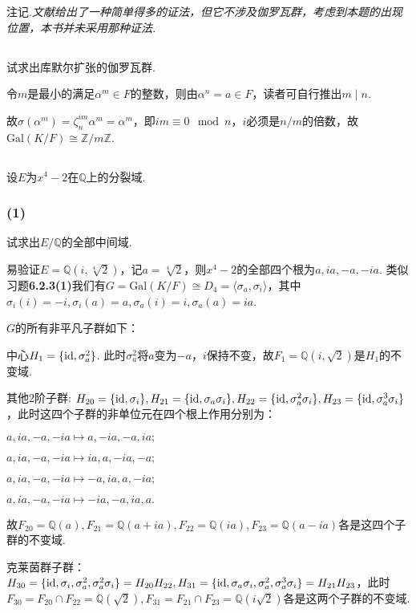{\heiti 注记.}\emph{文献}\cite{403963}\emph{给出了一种简单得多的证法，但它不涉及伽罗瓦群，考虑到本题的出现位置，本书并未采用那种证法.}

\subsection{}
试求出库默尔扩张的伽罗瓦群.

\jie 令$m$是最小的满足$\alpha^m\in F$的整数，则由$\alpha^n=a\in F$，读者可自行推出$m\mid n$.

故$\sigma(\alpha^m)=\zeta_n^{im}\alpha^m=\alpha^m$，即$im\equiv 0\mod n$，$i$必须是$n/m$的倍数，故$\mathrm{Gal}(K/F)\cong \mathbb{Z}/m\mathbb{Z}$.

\subsection{}
设$E$为$x^4-2$在$\mathbb{Q}$上的分裂域.
\subsubsection{(1)}
试求出$E/\mathbb{Q}$的全部中间域.

\jie 易验证$E=\mathbb{Q}(i,\sqrt[4]{2})$，记$a=\sqrt[4]{2}$，则$x^4-2$的全部四个根为$a,ia,-a,-ia$. 类似{\heiti 习题}\textbf{6.2.3(1)}我们有$G=\mathrm{Gal}(K/F)\cong D_4=\langle \sigma_a, \sigma_i\rangle$，其中$\sigma_i(i)=-i,\sigma_i(a)=a, \sigma_a(i)=i, \sigma_a(a)=ia$.

$G$的所有非平凡子群如下：

中心$H_1=\{\operatorname{id}, \sigma_a^2\}$. 此时$\sigma_a^2$将$a$变为$-a$，$i$保持不变，故$F_1=\mathbb{Q}(i,\sqrt{2})$是$H_1$的不变域.

其他$2$阶子群: $H_{20}=\{\operatorname{id}, \sigma_i\}, H_{21}=\{\operatorname{id}, \sigma_a\sigma_i\}, H_{22}=\{\operatorname{id}, \sigma_a^2\sigma_i\}, H_{23}=\{\operatorname{id}, \sigma_a^3\sigma_i\}$，此时这四个子群的非单位元在四个根上作用分别为：

$a,ia,-a,-ia\mapsto a,-ia,-a,ia;$

$a,ia,-a,-ia\mapsto ia,a,-ia,-a;$

$a,ia,-a,-ia\mapsto -a,ia,a,-ia;$

$a,ia,-a,-ia\mapsto -ia,-a,ia,a.$

故$F_{20}=\mathbb{Q}(a), F_{21}=\mathbb{Q}(a+ia), F_{22}=\mathbb{Q}(ia), F_{23}=\mathbb{Q}(a-ia)$各是这四个子群的不变域.

克莱茵群子群：$H_{30}=\{\operatorname{id}, \sigma_i, \sigma_a^2, \sigma_a^2\sigma_i\}=H_{20}H_{22}, H_{31}=\{\operatorname{id}, \sigma_a\sigma_i, \sigma_a^2, \sigma_a^3\sigma_i\}=H_{21}H_{23}$，此时$F_{30}=F_{20}\cap F_{22}=\mathbb{Q}(\sqrt{2}), F_{31}=F_{21}\cap F_{23}=\mathbb{Q}(i\sqrt{2})$各是这两个子群的不变域.

